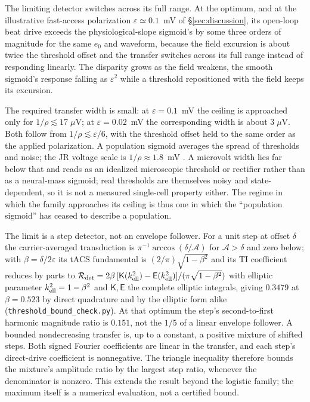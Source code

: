 \documentclass[11pt,a4paper]{article}
\begin{document}
The limiting detector switches across its full range. At the optimum,
and at the illustrative fast-access polarization $\varepsilon\!\simeq\!0.1$~mV
of \S\ref{sec:discussion}, its open-loop beat drive
exceeds the physiological-slope sigmoid's by some three orders of magnitude for the same
$e_0$ and waveform, because the field excursion is about twice the threshold offset and the
transfer switches across its full range instead of responding linearly. The disparity grows
as the field weakens, the smooth sigmoid's response falling as $\varepsilon^2$ while a
threshold repositioned with the field keeps its excursion.

The required transfer width is small: at $\varepsilon=0.1$~mV the ceiling is approached only for
$1/\rho\lesssim17\;\mu$V; at $\varepsilon=0.02$~mV the corresponding width is
about $3\;\mu$V. Both follow from $1/\rho\lesssim\varepsilon/6$, with the
threshold offset held to the same order as the applied polarization. A population
sigmoid averages the spread of thresholds and noise; the JR voltage scale is
$1/\rho\approx1.8$~mV \cite{jansen1995}. A
microvolt width lies far below that and reads as an idealized microscopic threshold or
rectifier rather than as a neural-mass sigmoid; real thresholds are themselves noisy and
state-dependent, so it is not a measured single-cell property either. The
regime in which the family approaches its ceiling is thus one in which the ``population
sigmoid'' has ceased to describe a population.

The limit is a step detector, not an envelope follower. For a unit step at offset
$\delta$ the carrier-averaged transduction is $\pi^{-1}\arccos(\delta/\mathcal A)$ for $\mathcal A>\delta$
and zero below; with $\beta=\delta/2\varepsilon$ its tACS fundamental is
$(2/\pi)\sqrt{1-\beta^2}$ and its TI coefficient reduces by parts to
$\mathcal R_{\rm det}=2\beta\,[\mathsf K(k_{\rm ell}^2)-\mathsf E(k_{\rm ell}^2)]/(\pi\sqrt{1-\beta^2})$
with elliptic parameter $k_{\rm ell}^2=1-\beta^2$ and $\mathsf K,\mathsf E$
the complete elliptic integrals, giving $0.3479$ at $\beta=0.523$ by direct quadrature and
by the elliptic form alike (\texttt{threshold\_bound\_check.py}). At that optimum the
step's second-to-first harmonic magnitude ratio is $0.151$, not the $1/5$ of a linear
envelope follower. A bounded nondecreasing transfer is, up to a constant, a positive
mixture of shifted steps. Both signed Fourier coefficients are linear in the
transfer, and each step's direct-drive coefficient is nonnegative. The triangle
inequality therefore bounds the mixture's amplitude ratio by the largest step
ratio, whenever the denominator is nonzero. This extends the result beyond the
logistic family; the maximum itself is a numerical evaluation, not a certified bound.
\end{document}
